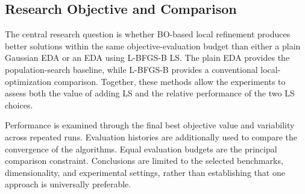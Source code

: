 \subsection{Research Objective and Comparison}


The central research question is whether BO-based local refinement produces better solutions within the same objective-evaluation budget than either a plain Gaussian EDA or an EDA using L-BFGS-B LS. The plain EDA provides the population-search baseline, while L-BFGS-B provides a conventional local-optimization comparison. Together, these methods allow the experiments to assess both the value of adding LS and the relative performance of the two LS choices.

Performance is examined through the final best objective value and variability
across repeated runs. Evaluation histories are additionally used to
compare the convergence of the algorithms. Equal evaluation budgets are the principal comparison constraint. Conclusions are limited to the selected benchmarks, dimensionality, and experimental settings, rather than establishing that one approach is universally preferable.
